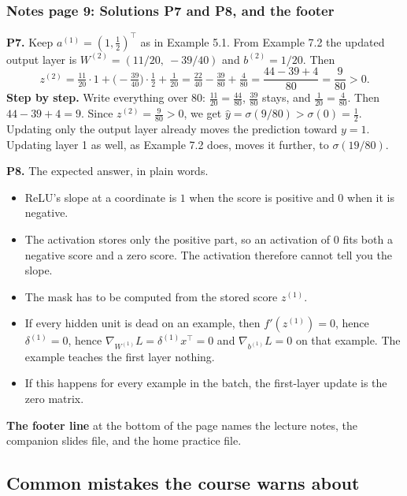 \subsubsection{Notes page 9: Solutions P7 and P8, and the footer}

\textbf{P7.} Keep $a^{(1)}=(1,\tfrac12)^\top$ as in Example 5.1. From Example 7.2 the updated output layer is $W^{(2)}=(11/20,\ -39/40)$ and $b^{(2)}=1/20$. Then
\[
z^{(2)}=\tfrac{11}{20}\cdot1+\Big(-\tfrac{39}{40}\Big)\cdot\tfrac12+\tfrac1{20}=\tfrac{22}{40}-\tfrac{39}{80}+\tfrac4{80}=\frac{44-39+4}{80}=\frac{9}{80}>0 .
\]
\textbf{Step by step.} Write everything over $80$: $\tfrac{11}{20}=\tfrac{44}{80}$, $\tfrac{39}{80}$ stays, and $\tfrac1{20}=\tfrac4{80}$. Then $44-39+4=9$. Since $z^{(2)}=\tfrac9{80}>0$, we get $\hat{y}=\sigma(9/80)>\sigma(0)=\tfrac12$. Updating only the output layer already moves the prediction toward $y=1$. Updating layer 1 as well, as Example 7.2 does, moves it further, to $\sigma(19/80)$.

\textbf{P8.} The expected answer, in plain words.
\begin{itemize}
\item ReLU's slope at a coordinate is $1$ when the score is positive and $0$ when it is negative.
\item The activation stores only the positive part, so an activation of $0$ fits both a negative score and a zero score. The activation therefore cannot tell you the slope.
\item The mask has to be computed from the stored score $z^{(1)}$.
\item If every hidden unit is dead on an example, then $f'(z^{(1)})=0$, hence $\delta^{(1)}=0$, hence $\nabla_{W^{(1)}}L=\delta^{(1)}x^\top=0$ and $\nabla_{b^{(1)}}L=0$ on that example. The example teaches the first layer nothing.
\item If this happens for every example in the batch, the first-layer update is the zero matrix.
\end{itemize}

\textbf{The footer line} at the bottom of the page names the lecture notes, the companion slides file, and the home practice file.

\subsection{Common mistakes the course warns about}

